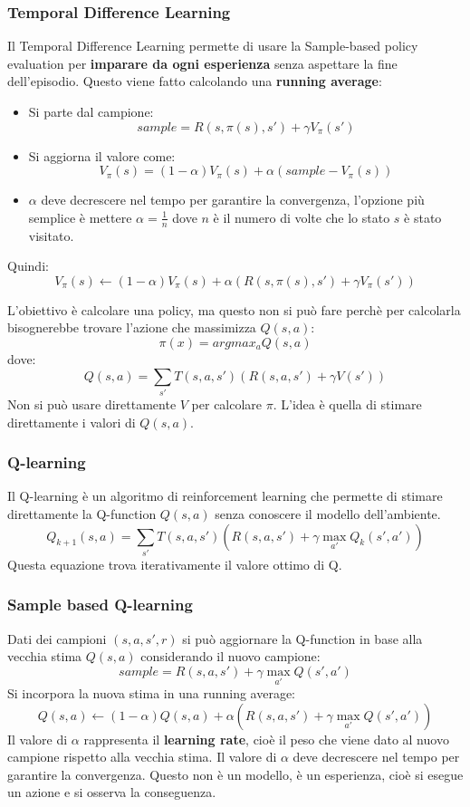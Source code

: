 \documentclass[a4paper]{article}
\begin{document}
\subsubsection{Temporal Difference Learning}
Il Temporal Difference Learning permette di usare la Sample-based policy evaluation
per \textbf{imparare da ogni esperienza} senza aspettare la fine dell'episodio.
Questo viene fatto calcolando una \textbf{running average}:
\begin{itemize}
  \item Si parte dal campione:
    \[
      sample = R(s, \pi(s), s') + \gamma V_{\pi}(s')
    \] 

  \item Si aggiorna il valore come:
    \[
      V_{\pi}(s) = (1 - \alpha) V_{\pi}(s) + \alpha (sample - V_{\pi}(s))
    \] 

  \item \( \alpha \) deve decrescere nel tempo per garantire la convergenza,
    l'opzione più semplice è mettere \( \alpha = \frac{1}{n} \) dove \( n \)
    è il numero di volte che lo stato \( s \) è stato visitato.
\end{itemize}
Quindi:
\[
  V_{\pi}(s) \leftarrow (1 - \alpha) V_{\pi}(s) + \alpha \left( R(s, \pi(s), s') + \gamma V_{\pi}(s') \right)
\] 

\vspace{1em}
\noindent
L'obiettivo è calcolare una policy, ma questo non si può fare perchè per calcolarla bisognerebbe
trovare l'azione che massimizza \( Q(s,a) \):
\[
  \pi(x) = argmax_a Q(s,a)
\] 
dove:
\[
  Q(s,a) = \sum_{s'} T(s, a, s') \left( R(s, a, s') + \gamma V(s') \right)
\] 
Non si può usare direttamente \( V \) per calcolare \( \pi \).
L'idea è quella di stimare direttamente i valori di \( Q(s,a) \).

\subsubsection{Q-learning}
Il Q-learning è un algoritmo di reinforcement learning che permette di stimare
direttamente la Q-function \( Q(s,a) \) senza conoscere il modello dell'ambiente.
\[
  Q_{k+1}(s,a) = \sum_{s'} T(s, a, s') \left( R(s, a, s') + \gamma \max_{a'} Q_k(s', a') \right)
\] 
Questa equazione trova iterativamente il valore ottimo di Q.

\subsubsection{Sample based Q-learning}
Dati dei campioni \( (s, a, s', r) \) si può aggiornare la Q-function in base alla
vecchia stima \( Q(s,a) \)  considerando il nuovo campione:
\[
  sample = R(s, a, s') + \gamma \max_{a'} Q(s', a')
\] 
Si incorpora la nuova stima in una running average:
\[
  Q(s,a) \leftarrow (1 - \alpha) Q(s,a) + \alpha (R(s, a, s') + \gamma \max_{a'} Q(s', a'))
\] 
Il valore di \( \alpha \) rappresenta il \textbf{learning rate}, cioè il peso che
viene dato al nuovo campione rispetto alla vecchia stima. Il valore di \( \alpha \)
deve decrescere nel tempo per garantire la convergenza.
Questo non è un modello, è un esperienza, cioè si esegue un azione e si osserva
la conseguenza.
\end{document}
